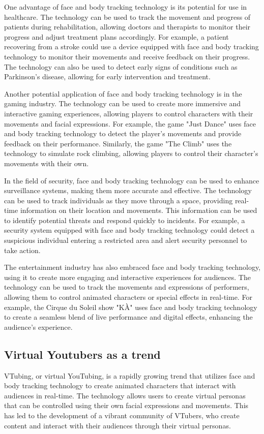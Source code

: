 One advantage of face and body tracking technology is its potential for use in healthcare. The technology can be used to track 
the movement and progress of patients during rehabilitation, allowing doctors and therapists to monitor their progress 
and adjust treatment plans accordingly. For example, a patient recovering from a stroke could use a device equipped 
with face and body tracking technology to monitor their movements and receive feedback on their progress. 
The technology can also be used to detect early signs of conditions such as Parkinson's disease, allowing for early intervention and treatment.

Another potential application of face and body tracking technology is in the gaming industry. 
The technology can be used to create more immersive and interactive gaming experiences, allowing 
players to control characters with their movements and facial expressions. For example, the game 
"Just Dance" uses face and body tracking technology to detect the player's movements and provide 
feedback on their performance. Similarly, the game "The Climb" uses the technology to simulate rock 
climbing, allowing players to control their character's movements with their own.

In the field of security, face and body tracking technology can be used to enhance surveillance systems, making them 
more accurate and effective. The technology can be used to track individuals as they move through a space, providing real-time 
information on their location and movements. This information can be used to identify potential threats and respond quickly 
to incidents. For example, a security system equipped with face and body tracking technology could detect a suspicious 
individual entering a restricted area and alert security personnel to take action.

The entertainment industry has also embraced face and body tracking technology, using it to create more engaging and 
interactive experiences for audiences. The technology can be used to track the movements and expressions of performers, 
allowing them to control animated characters or special effects in real-time. For example, the Cirque du Soleil show "KÀ" uses face and body 
tracking technology to create a seamless blend of live performance and digital effects, enhancing the audience's experience. \cite{cirque}

\subsection{Virtual Youtubers as a trend}
VTubing, or virtual YouTubing, is a rapidly growing trend that utilizes face and body tracking 
technology to create animated characters that interact with audiences in real-time. The technology allows users to 
create virtual personas that can be controlled using their own facial expressions and movements. 
This has led to the development of a vibrant community of VTubers, who create content and interact with their 
audiences through their virtual personas.


